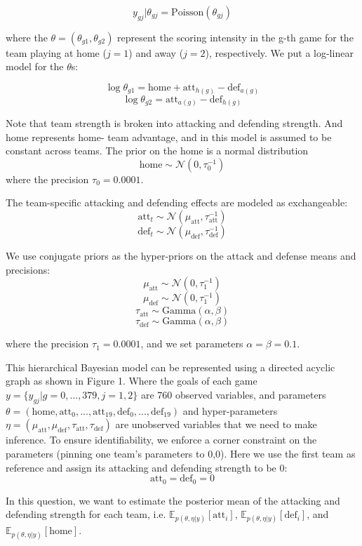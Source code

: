 \documentclass{article}
\begin{document}
$$y_{gj} | \theta_{gj} = \text{Poisson}(\theta_{gj})$$

where the $\theta = (\theta_{g1}, \theta_{g2})$ represent the scoring intensity in the g-th game for the team playing at home
($j = 1$) and away ($j = 2$), respectively. We put a log-linear model for the $\theta$s:

$$\log \theta_{g1} = \text{home} + \text{att}_{h(g)} - \text{def}_{a(g)}$$
$$\log \theta_{g2} = \text{att}_{a(g)} - \text{def}_{h(g)}$$

Note that team strength is broken into attacking and defending strength. And home represents home-
team advantage, and in this model is assumed to be constant across teams. The prior on the home is a
normal distribution
$$\text{home} \sim \mathcal{N}(0, \tau_0^{-1})$$
where the precision $\tau_0 = 0.0001$.

The team-specific attacking and defending effects are modeled as exchangeable:
$$\text{att}_t \sim \mathcal{N}(\mu_{\text{att}}, \tau_{\text{att}}^{-1})$$
$$\text{def}_t \sim \mathcal{N}(\mu_{\text{def}}, \tau_{\text{def}}^{-1})$$

We use conjugate priors as the hyper-priors on the attack and defense means and precisions:
$$\mu_{\text{att}} \sim \mathcal{N}(0, \tau_1^{-1})$$
$$\mu_{\text{def}} \sim \mathcal{N}(0, \tau_1^{-1})$$
$$\tau_{\text{att}} \sim \text{Gamma}(\alpha, \beta)$$
$$\tau_{\text{def}} \sim \text{Gamma}(\alpha, \beta)$$

where the precision $\tau_1 = 0.0001$, and we set parameters $\alpha = \beta = 0.1$.

This hierarchical Bayesian model can be represented using a directed acyclic graph as shown in Figure 1.
Where the goals of each game $y = \{y_{gj}|g = 0, ..., 379, j = 1, 2\}$ are 760 observed variables, and parameters
$\theta = (\text{home}, \text{att}_0, ..., \text{att}_{19}, \text{def}_0, ..., \text{def}_{19})$ and hyper-parameters $\eta = (\mu_{\text{att}}, \mu_{\text{def}}, \tau_{\text{att}}, \tau_{\text{def}})$ are unobserved
variables that we need to make inference. To ensure identifiability, we enforce a corner constraint on the
parameters (pinning one team's parameters to 0,0). Here we use the first team as reference and assign its
attacking and defending strength to be 0:
$$\text{att}_0 = \text{def}_0 = 0$$

In this question, we want to estimate the posterior mean of the attacking and defending strength for each
team, i.e. $\mathbb{E}_{p(\theta,\eta|y)}[\text{att}_i]$, $\mathbb{E}_{p(\theta,\eta|y)}[\text{def}_i]$, and $\mathbb{E}_{p(\theta,\eta|y)}[\text{home}]$.
\end{document}
